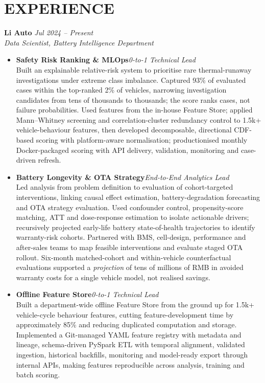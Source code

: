 \documentclass[a4paper,10pt]{article}
\begin{document}
\section{EXPERIENCE}
\textbf{Li Auto} \hfill \textit{Jul 2024 -- Present}\\
\textit{Data Scientist, Battery Intelligence Department}
\begin{itemize}
\item \textbf{Safety Risk Ranking \& MLOps}\hfill{\small\textit{0-to-1 Technical Lead}}\\[-1pt] Built an explainable relative-risk system to prioritise rare thermal-runaway investigations under extreme class imbalance. Captured 93\% of evaluated cases within the top-ranked 2\% of vehicles, narrowing investigation candidates from tens of thousands to thousands; the score ranks cases, not failure probabilities. Used features from the in-house Feature Store; applied Mann--Whitney screening and correlation-cluster redundancy control to 1.5k+ vehicle-behaviour features, then developed decomposable, directional CDF-based scoring with platform-aware normalisation; productionised monthly Docker-packaged scoring with API delivery, validation, monitoring and case-driven refresh.
\item \textbf{Battery Longevity \& OTA Strategy}\hfill{\small\textit{End-to-End Analytics Lead}}\\[-1pt] Led analysis from problem definition to evaluation of cohort-targeted interventions, linking causal effect estimation, battery-degradation forecasting and OTA strategy evaluation. Used confounder control, propensity-score matching, ATT and dose-response estimation to isolate actionable drivers; recursively projected early-life battery state-of-health trajectories to identify warranty-risk cohorts. Partnered with BMS, cell-design, performance and after-sales teams to map feasible interventions and evaluate staged OTA rollout. Six-month matched-cohort and within-vehicle counterfactual evaluations supported a \emph{projection} of tens of millions of RMB in avoided warranty costs for a single vehicle model, not realised savings.
\item \textbf{Offline Feature Store}\hfill{\small\textit{0-to-1 Technical Lead}}\\[-1pt] Built a department-wide offline Feature Store from the ground up for 1.5k+ vehicle-cycle behaviour features, cutting feature-development time by approximately 85\% and reducing duplicated computation and storage. Implemented a Git-managed YAML feature registry with metadata and lineage, schema-driven PySpark ETL with temporal alignment, validated ingestion, historical backfills, monitoring and model-ready export through internal APIs, making features reproducible across analysis, training and batch scoring.

\end{itemize}
\end{document}
